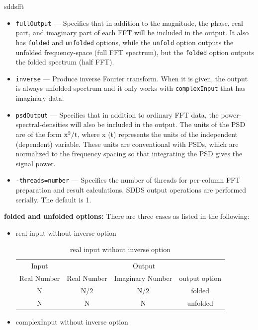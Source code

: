 \begin{sddsprog}{sddsfft}
\begin{itemize}
      \item \verb|fullOutput| --- Specifies that in addition to the magnitude, the phase, real part, and imaginary part of each FFT will be included in the output. It also has \verb|folded| and \verb|unfolded| options, while the \verb|unfold| option outputs the unfolded frequency-space (full FFT spectrum), but the \verb|folded| option outputs the folded spectrum (half FFT).
      \item \verb|inverse| --- Produce inverse Fourier transform. When it is given, the output is always unfolded spectrum and it only works with \verb|complexInput| that has imaginary data.
      \item \verb|psdOutput| --- Specifies that in addition to ordinary FFT data, the power-spectral-densities will also be included in the output. The units of the PSD are of the form ${\rm x^2/t}$, where x (t) represents the units of the independent (dependent) variable. These units are conventional with PSDs, which are normalized to the frequency spacing so that integrating the PSD gives the signal power.
      \item \verb|-threads=number| --- Specifies the number of threads for per-column FFT preparation and result calculations. SDDS output operations are performed serially. The default is 1.
    \end{itemize}
  \item \textbf{folded and unfolded options:} There are three cases as listed in the following:
    \begin{itemize}
      \item real input without inverse option
        \begin{table}[hbt]
          \caption{real input without inverse option}
          \begin{tabular}{|c|c|c|c|}
            Input & \multicolumn{3}{|c|}{Output} \\
            Real Number & Real Number & Imaginary Number & output option \\ \hline
            N & N/2 & N/2 & folded \\ \hline
            N & N & N & unfolded \\ \hline
          \end{tabular}
          \label{table1}
        \end{table}
      \item complexInput without inverse option
        \begin{table}[hbt]
          \caption{complexInput without inverse option}

\end{table}
\end{itemize}
\end{sddsprog}
